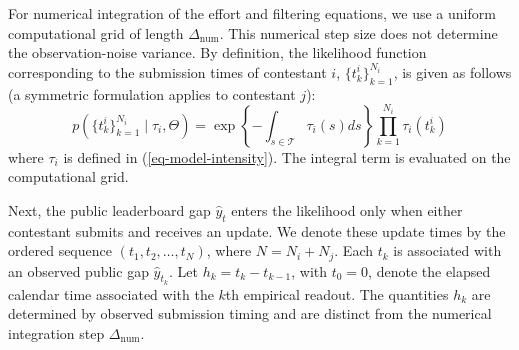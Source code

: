 \documentclass[mnsc]{informs3}
\begin{document}
For numerical integration of the effort and filtering equations, we use a uniform computational grid of length $\Delta_{\mathrm{num}}$. This numerical step size does not determine the observation-noise variance.
By definition, the likelihood function corresponding to the submission times of contestant $i$, $\{t^i_k\}_{k=1}^{N_i}$, is given as follows (a symmetric formulation applies to contestant $j$):
\begin{equation}\label{eq-ihpp-prob}
p\left(\{t^i_k\}_{k=1}^{N_i}\mid\tau_i,\Theta\right)
=
\exp\left\{-\int_{s\in\mathcal T}\tau_i(s)ds\right\}
\prod_{k=1}^{N_i}\tau_i(t^i_k)
\end{equation}
where $\tau_i$ is defined in (\ref{eq-model-intensity}).
The integral term is evaluated on the computational grid.

Next, the public leaderboard gap $\hat y_t$ enters the likelihood only when either contestant submits and receives an update.
We denote these update times by the ordered sequence $(t_1,t_2,\ldots,t_N)$, where $N=N_i+N_j$.
Each $t_k$ is associated with an observed public gap $\hat{y}_{t_k}$.
Let $h_k=t_k-t_{k-1}$, with $t_0=0$, denote the elapsed calendar time associated with the $k$th empirical readout. The quantities $h_k$ are determined by observed submission timing and are distinct from the numerical integration step $\Delta_{\mathrm{num}}$.
\end{document}
